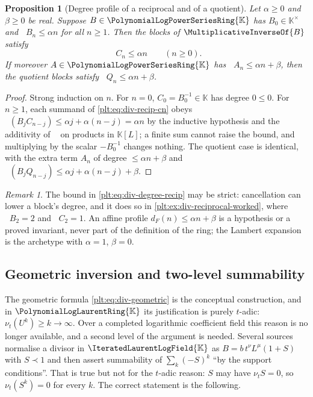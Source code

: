 \documentclass[11pt,oneside]{article}
\theoremstyle{plain}
\newtheorem{proposition}[theorem]{Proposition}
\theoremstyle{definition}
\theoremstyle{remark}
\newtheorem{remark}[theorem]{Remark}
\newcommand{\K}{\mathbb{K}}
\newcommand{\PLpow}{\PolynomialLogPowerSeriesRing{\K}}   %
\newcommand{\PLlau}{\PolynomialLogLaurentRing{\K}}       %
\newcommand{\PLit}{\IteratedLaurentLogField{\K}}         %
\newcommand{\ordt}{\nu_{t}}                              %
\DeclareMathOperator{\degL}{deg_{L}}
\newcommand{\recip}[1]{\MultiplicativeInverseOf{#1}}
\newcommand{\dprofile}[1]{d_{#1}}                        %
\newcommand{\precdom}{\prec}
\begin{document}
\begin{proposition}[Degree profile of a reciprocal and of a quotient]
\label{plt:prop:div-degree-profile}
Let \(\alpha\ge0\) and \(\beta\ge0\) be real.  Suppose \(B\in\PLpow\) has
\(B_{0}\in\K^{\times}\) and \(\degL B_{n}\le\alpha n\) for all \(n\ge1\).  Then
the blocks of \(\recip{B}\) satisfy
\begin{equation}\label{plt:eq:div-degree-recip}
  \degL C_{n}\le\alpha n\qquad(n\ge0).
\end{equation}
If moreover \(A\in\PLpow\) has \(\degL A_{n}\le\alpha n+\beta\), then the
quotient blocks satisfy \(\degL Q_{n}\le\alpha n+\beta\).
\end{proposition}

\begin{proof}
Strong induction on \(n\).  For \(n=0\), \(C_{0}=B_{0}^{-1}\in\K\) has degree
\(0\le0\).  For \(n\ge1\), each summand of \cref{plt:eq:div-recip-cn} obeys
\(\degL(B_{j}C_{n-j})\le\alpha j+\alpha(n-j)=\alpha n\) by the inductive
hypothesis and the additivity of \(\degL\) on products in \(\K[L]\); a finite
sum cannot raise the bound, and multiplying by the scalar \(-B_{0}^{-1}\)
changes nothing.  The quotient case is identical, with the extra term \(A_{n}\)
of degree \(\le\alpha n+\beta\) and \(\degL(B_{j}Q_{n-j})\le\alpha
j+\alpha(n-j)+\beta\).
\end{proof}

\begin{remark}
The bound in \cref{plt:eq:div-degree-recip} may be strict: cancellation can
lower a block's degree, and it does so in
\cref{plt:ex:div-reciprocal-worked}, where \(\degL B_{2}=2\) and \(\degL
C_{2}=1\).  An affine profile \(\dprofile{F}(n)\le\alpha n+\beta\) is a
hypothesis or a proved invariant, never part of the definition of the ring; the
Lambert expansion is the archetype with \(\alpha=1\), \(\beta=0\).
\end{remark}

\subsection{Geometric inversion and two-level summability}
\label{plt:sec:div-geometric}

The geometric formula \cref{plt:eq:div-geometric} is the conceptual
construction, and in \(\PLlau\) its justification is purely \(t\)-adic:
\(\ordt(U^{k})\ge k\to\infty\).  Over a completed logarithmic coefficient field
this reason is no longer available, and a second level of the argument is
needed.  Several sources normalise a divisor in \(\PLit\) as
\(B=b\,t^{\nu}L^{\mu}(1+S)\) with \(S\precdom1\) and then assert summability of
\(\sum_{k}(-S)^{k}\) ``by the support conditions''.  That is true but not for
the \(t\)-adic reason: \(S\) may have \(\ordt S=0\), so \(\ordt(S^{k})=0\) for
every \(k\).  The correct statement is the following.
\end{document}
